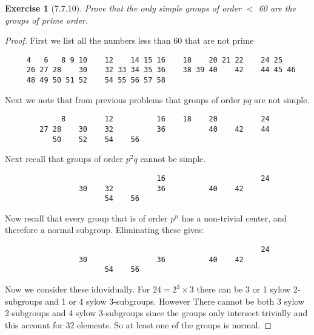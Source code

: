 \documentclass[12pt]{article}
\newtheorem*{exer}{Exercise}
\begin{document}

\begin{exer}[7.7.10]

    Prove that the only simple groups of order $<$ 60 are the groups of
    prime order.

\end{exer}

\begin{proof}

    First we list all the numbers less than 60 that are not prime 

    \begin{verbatim}
     4   6   8 9 10    12    14 15 16    18    20 21 22    24 25
     26 27 28    30    32 33 34 35 36    38 39 40    42    44 45 46
     48 49 50 51 52    54 55 56 57 58
     \end{verbatim}

     Next we note that from previous problems that groups of order $pq$
     are not simple.

     \begin{verbatim}
             8         12          16    18    20          24   
        27 28    30    32          36          40    42    44      
           50    52    54    56      
     \end{verbatim}

     Next recall that groups of order $p^2q$ cannot be simple.
        
     \begin{verbatim}
                                   16                      24   
                 30    32          36          40    42            
                       54    56      
     \end{verbatim}

     Now recall that every group that is of order $p^n$ has a
     non-trivial center, and therefore a normal subgroup. Eliminating
     these gives:

     \begin{verbatim}
                                                           24   
                 30                36          40    42            
                       54    56      
     \end{verbatim}

     Now we consider these iduvidually. For $24 = 2^3 \times 3$ there can be
     3 or 1 sylow 2-subgroups and 1 or 4 sylow 3-subgroups. However
     There cannot be both 3 sylow 2-subgroups and 4 sylow 3-subgroups
     since the groups only intersect trivially and this account for 32
     elements. So at least one of the groups is normal.


\end{proof}
\end{document}
